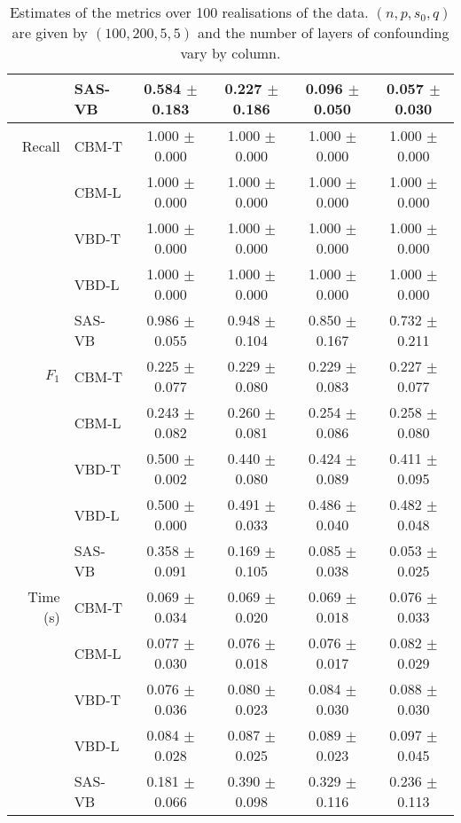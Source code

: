 \documentclass[11pt]{article}
\numberwithin{equation}{section}
\begin{document}
\begin{table}
{\begin{tabular}{r|l|cccc}
                & SAS-VB          & 0.584 $\pm$ 0.183  & 0.227 $\pm$ 0.186   & 0.096 $\pm$ 0.050   & 0.057 $\pm$ 0.030\\\hline
Recall          & CBM-T           & 1.000 $\pm$ 0.000  & 1.000 $\pm$ 0.000   & 1.000 $\pm$ 0.000   & 1.000 $\pm$ 0.000\\
                & CBM-L           & 1.000 $\pm$ 0.000  & 1.000 $\pm$ 0.000   & 1.000 $\pm$ 0.000   & 1.000 $\pm$ 0.000\\
                & VBD-T           & 1.000 $\pm$ 0.000  & 1.000 $\pm$ 0.000   & 1.000 $\pm$ 0.000   & 1.000 $\pm$ 0.000\\
                & VBD-L           & 1.000 $\pm$ 0.000  & 1.000 $\pm$ 0.000   & 1.000 $\pm$ 0.000   & 1.000 $\pm$ 0.000\\
                & SAS-VB          & 0.986 $\pm$ 0.055  & 0.948 $\pm$ 0.104   & 0.850 $\pm$ 0.167   & 0.732 $\pm$ 0.211\\\hline
$F_1$           & CBM-T           & 0.225 $\pm$ 0.077  & 0.229 $\pm$ 0.080   & 0.229 $\pm$ 0.083   & 0.227 $\pm$ 0.077\\
                & CBM-L           & 0.243 $\pm$ 0.082  & 0.260 $\pm$ 0.081   & 0.254 $\pm$ 0.086   & 0.258 $\pm$ 0.080\\
                & VBD-T           & 0.500 $\pm$ 0.002  & 0.440 $\pm$ 0.080   & 0.424 $\pm$ 0.089   & 0.411 $\pm$ 0.095\\
                & VBD-L           & 0.500 $\pm$ 0.000  & 0.491 $\pm$ 0.033   & 0.486 $\pm$ 0.040   & 0.482 $\pm$ 0.048\\
                & SAS-VB          & 0.358 $\pm$ 0.091  & 0.169 $\pm$ 0.105   & 0.085 $\pm$ 0.038   & 0.053 $\pm$ 0.025\\\hline
Time (s)        & CBM-T           & 0.069 $\pm$ 0.034  & 0.069 $\pm$ 0.020   & 0.069 $\pm$ 0.018   & 0.076 $\pm$ 0.033\\
                & CBM-L           & 0.077 $\pm$ 0.030  & 0.076 $\pm$ 0.018   & 0.076 $\pm$ 0.017   & 0.082 $\pm$ 0.029\\
                & VBD-T           & 0.076 $\pm$ 0.036  & 0.080 $\pm$ 0.023   & 0.084 $\pm$ 0.030   & 0.088 $\pm$ 0.030\\
                & VBD-L           & 0.084 $\pm$ 0.028  & 0.087 $\pm$ 0.025   & 0.089 $\pm$ 0.023   & 0.097 $\pm$ 0.045\\
                & SAS-VB          & 0.181 $\pm$ 0.066  & 0.390 $\pm$ 0.098   & 0.329 $\pm$ 0.116   & 0.236 $\pm$ 0.113\\
\bottomrule
\end{tabular}
}
\caption{Estimates of the metrics over 100 realisations of the data. $(n, p, s_0, q)$ are given by $(100, 200, 5, 5)$ and the number of layers of confounding vary by column.}\label{Tab:multi_layer}
\end{table}
\end{document}
